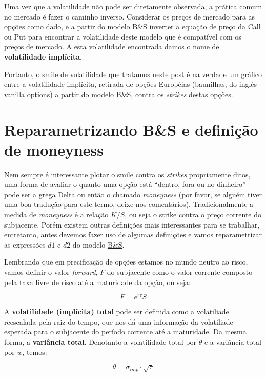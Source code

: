 \documentclass[]{book}
\begin{document}
Uma vez que a volatilidade não pode ser diretamente observada, a prática
comum no mercado é fazer o caminho inverso. Considerar os preços de
mercado para as opções como dado, e a partir do modelo
\protect\hyperlink{bsm}{B\&S} inverter a equação de preço da Call ou Put
para encontrar a volatilidade deste modelo que é compatível com os
preços de mercado. A esta volatilidade encontrada damos o nome de
\textbf{volatilidade implícita}.

Portanto, o smile de volatilidade que tratamos neste post é na verdade
um gráfico entre a volatilidade implícita, retirada de opções Européias
(baunilhas, do inglês vanilla options) a partir do modelo B\&S, contra
os \emph{strikes} destas opções.

\section{Reparametrizando B\&S e definição de
moneyness}\label{reparametrizando}

Nem sempre é interessante plotar o smile contra os \emph{strikes}
propriamente ditos, uma forma de avaliar o quanto uma opção está
``dentro, fora ou no dinheiro'' pode ser a grega Delta ou então o
chamado \emph{moneyness} (por favor, se alguém tiver uma boa tradução
para este termo, deixe nos comentários). Tradicionalmente a medida de
\emph{moneyness} é a relação \(K/S\), ou seja o strike contra o preço
corrente do subjacente. Porém existem outras definições mais
interessantes para se trabalhar, entretanto, antes devemos fazer uso de
algumas definições e vamos reparametrizar as expressões \(d1\) e \(d2\)
do modelo \protect\hyperlink{bsm}{B\&S}.

Lembrando que em precificação de opções estamos no mundo neutro ao
risco, vamos definir o valor \emph{forward}, \(F\) do subjacente como o
valor corrente composto pela taxa livre de risco até a maturidade da
opção, ou seja:

\begin{equation}
F=e^{r\tau}S
\end{equation}

A \textbf{volatilidade (implícita) total} pode ser definida como a
volatiliade reescalada pela raiz do tempo, que nos dá uma informação da
volatiliade esperada para o subjacente do período corrente até a
maturidade. Da mesma forma, a \textbf{variância total}. Denotanto a
volatilidade total por \(\theta\) e a variância total por \(w\), temos:

\begin{equation}
\theta=\sigma_{imp}\cdot \sqrt{\tau} 
\label{eq:voltotal}
\end{equation}
\end{document}
